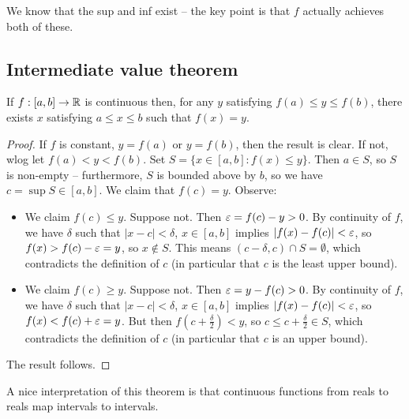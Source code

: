 \documentclass{../template/note}
\begin{document}
    \begin{remark*}
        We know that the sup and inf exist -- the key point is that \(f\) actually achieves both of these.
    \end{remark*}
    
    \subsection{Intermediate value theorem}
    
    \begin{theorem}
        \label{ivt}
        If \(f: [a, b] \to \mathbb R\) is continuous then, for any \(y\) satisfying \(f(a) \leq y \leq f(b)\), there exists \(x\) satisfying \(a \leq x \leq b\) such that \(f(x) = y\).
    \end{theorem}
    
    \begin{proof}
        If \(f\) is constant, \(y=f(a)\) or \(y=f(b)\), then the result is clear. If not, wlog let \(f(a) < y < f(b)\). Set \(S = \{x \in [a, b]: f(x) \leq y\}\). Then \(a \in S\), so \(S\) is non-empty -- furthermore, \(S\) is bounded above by \(b\), so we have \(c = \sup S \in [a, b]\). We claim that \(f(c) = y\). Observe:
        \begin{itemize}
            \item We claim \(f(c) \leq y\). Suppose not. Then \(\varepsilon = f(c) - y > 0\). By continuity of \(f\), we have \(\delta\) such that \(|x-c| < \delta\), \(x \in [a, b]\) implies \(|f(x) - f(c)| < \varepsilon\), so \(f(x) > f(c) - \varepsilon = y\), so \(x \notin S\). This means \((c - \delta, c) \cap S = \emptyset\), which contradicts the definition of \(c\) (in particular that \(c\) is the least upper bound).
            \item We claim \(f(c) \geq y\). Suppose not. Then \(\varepsilon = y - f(c) > 0\). By continuity of \(f\), we have \(\delta\) such that \(|x-c| < \delta\), \(x \in [a, b]\) implies \(|f(x) - f(c)| < \varepsilon\), so \(f(x) < f(c) + \varepsilon = y\). But then \(f(c + \frac{\delta}2) < y\), so \(c \leq c + \frac{\delta}2 \in S\), which contradicts the definition of \(c\) (in particular that \(c\) is an upper bound).
        \end{itemize}
        The result follows.        
    \end{proof}
    
    \begin{remark*}
        A nice interpretation of this theorem is that continuous functions from reals to reals map intervals to intervals.
    \end{remark*}
    
\end{document}
